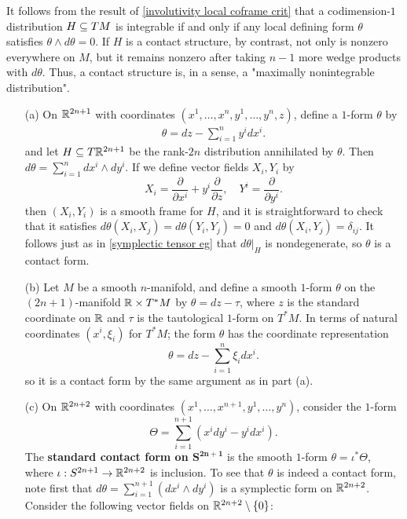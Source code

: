 It follows from the result of \cref{involutivity local coframe crit} that a codimension-$1$ distribution $H\subseteq TM$ is integrable if and only if any local defining form $\theta$ satisfies $\theta\wedge d\theta=0$. If $H$ is a contact structure, by contrast, not only is  nonzero everywhere on $M$, but it remains nonzero after taking $n-1$ more wedge products with $d\theta$. Thus, a contact structure is, in a sense, a "maximally nonintegrable distribution".

\begin{example}\label{contact forms eg}
\mbox{}
\begin{enumerate}
\item[(a)] On $\mathbb{R}^{2n+1}$ with coordinates $(x^1,\dots,x^n,y^1,\dots,y^n,z)$, define a $1$-form $\theta$ by
\begin{align}\label{contact form standard}
\theta=dz-\sum_{i=1}^{n}y^idx^i.
\end{align}
and let $H\subseteq T\mathbb{R}^{2n+1}$ be the rank-$2n$ distribution annihilated by $\theta$. Then $d\theta=\sum_{i=1}^{n}dx^i\wedge dy^i$. If we define vector fields $X_i,Y_i$ by
\[X_i=\frac{\partial}{\partial x^i}+y^i\frac{\partial}{\partial z},\quad Y^i=\frac{\partial}{\partial y^i}.\]
then $(X_i,Y_i)$ is a smooth frame for $H$, and it is straightforward to check that it satisfies $d\theta(X_i,X_j)=d\theta(Y_i,Y_j)=0$ and $d\theta(X_i,Y_j)=\delta_{ij}$. It follows just as in \cref{symplectic tensor eg} that $d\theta|_H$ is nondegenerate, so $\theta$ is a contact form.
\item[(b)] Let $M$ be a smooth $n$-manifold, and define a smooth $1$-form $\theta$ on the $(2n+1)$-manifold $\mathbb{R}\times T^*M$ by $\theta=dz-\tau$, where $z$ is the standard coordinate on $\mathbb{R}$ and $\tau$ is the tautological $1$-form on $T^*M$. In terms of natural coordinates $(x^i,\xi_i)$ for $T^*M$; the form $\theta$ has the coordinate representation
\[\theta=dz-\sum_{i=1}^{n}\xi_i dx^i.\]
so it is a contact form by the same argument as in part (a).
\item[(c)] On $\mathbb{R}^{2n+2}$ with coordinates $(x^1,\dots,x^{n+1},y^1,\dots,y^n)$, consider the $1$-form
\[\varTheta=\sum_{i=1}^{n+1}(x^idy^i-y^idx^i).\]
The \textbf{standard contact form on $\bm{S^{2n+1}}$} is the smooth $1$-form $\theta=\iota^*\varTheta$, where $\iota:S^{2n+1}\to\mathbb{R}^{2n+2}$ is inclusion. To see that $\theta$ is indeed a contact form, note first that $d\theta=\sum_{i=1}^{n+1}(dx^i\wedge dy^i)$ is a symplectic form on $\mathbb{R}^{2n+2}$. Consider the following vector fields on $\mathbb{R}^{2n+2}\setminus\{0\}$:

\end{enumerate}
\end{example}
